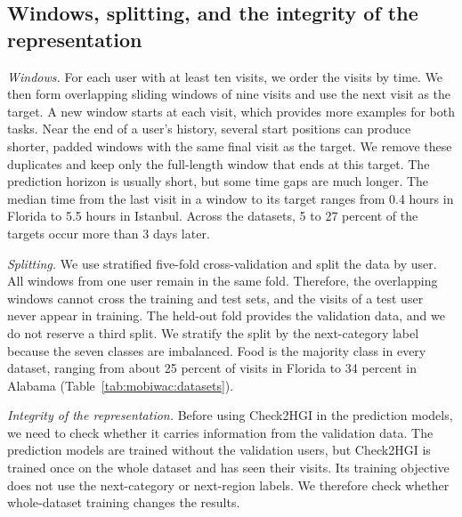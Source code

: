 

\subsection{Windows, splitting, and the integrity of the representation}
\label{sec:mobiwac:setup-windows}
\emph{Windows.} For each user with at least ten visits, we order the visits by time. We then form overlapping sliding windows of nine visits and use the next visit as the target. A new window starts at each visit, which provides more examples for both tasks. Near the end of a user's history, several start positions can produce shorter, padded windows with the same final visit as the target. We remove these duplicates and keep only the full-length window that ends at this target. The prediction horizon is usually short, but some time gaps are much longer. The median time from the last visit in a window to its target ranges from 0.4 hours in Florida to 5.5 hours in Istanbul. Across the datasets, 5 to 27 percent of the targets occur more than 3 days later.

\emph{Splitting.} We use stratified five-fold cross-validation and split the data by user. All windows from one user remain in the same fold. Therefore, the overlapping windows cannot cross the training and test sets, and the visits of a test user never appear in training. The held-out fold provides the validation data, and we do not reserve a third split. We stratify the split by the next-category label because the seven classes are imbalanced. Food is the majority class in every dataset, ranging from about 25 percent of visits in Florida to 34 percent in Alabama (Table~\ref{tab:mobiwac:datasets}).

\emph{Integrity of the representation.} Before using Check2HGI in the prediction
models, we need to check whether it carries information from the validation data. The
prediction models are trained without the validation users, but Check2HGI is trained
once on the whole dataset and has seen their visits. Its training objective does not
use the next-category or next-region labels. We therefore check whether whole-dataset
training changes the results.

